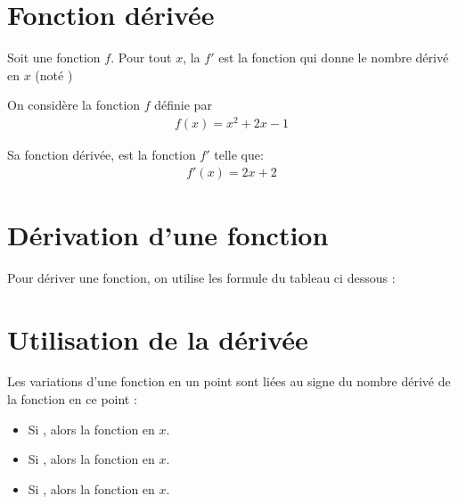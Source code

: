 \documentclass[12pt,a4paper]{article}
\newcommand{\disp}{true}
\begin{document}
	\section{Fonction dérivée}
	
	\begin{mydef}
		Soit une fonction $f$. Pour tout $x$, la  $f'$ est la fonction qui donne le nombre dérivé en $x$ (noté )  
	\end{mydef}
	
	\begin{myex}
		On considère la fonction $f$ définie par 
		\begin{align*}
		f(x) = x^2+2x-1
		\end{align*}
		
		Sa fonction dérivée, est la fonction $f'$ telle que:
		\begin{align*}
			f'(x) = 2x+2
		\end{align*}
	\end{myex}
	
\section{Dérivation d'une fonction}
	
	Pour dériver une fonction, on utilise les formule du tableau ci dessous :
	
	\begin{center}
		\drv{\disp}
	\end{center}
	
\section{Utilisation de la dérivée}
	
	\begin{myact}{1}
		
	\end{myact}
	
	\begin{myprop}
		Les variations d'une fonction en un point sont liées au signe du nombre dérivé de la fonction en ce point :
		\begin{itemize}
			\item Si , alors la fonction  en $x$.
			\item Si , alors la fonction  en $x$.
			\item Si , alors la fonction  en $x$. 
		\end{itemize}
	\end{myprop}
	
\end{document}

